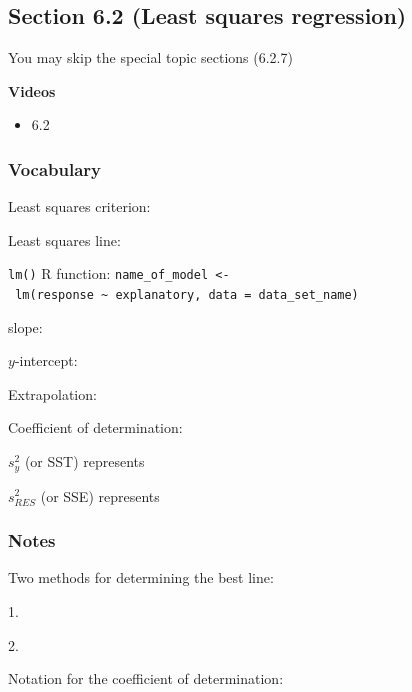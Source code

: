 \documentclass[
]{report}
\providecommand{\tightlist}{%
  \setlength{\itemsep}{0pt}\setlength{\parskip}{0pt}}
\newcommand{\rgs}{\vspace{12pt}} %
\newcommand{\rgi}{\hspace{24pt}}  %
\begin{document}
\hypertarget{section-6.2-least-squares-regression}{%
\subsection*{Section 6.2 (Least squares regression)}\label{section-6.2-least-squares-regression}}


You may skip the special topic sections (6.2.7)

\textbf{Videos}

\begin{itemize}
\tightlist
\item
  6.2
\end{itemize}


\hypertarget{vocabulary-6}{%
\subsubsection*{Vocabulary}\label{vocabulary-6}}

Least squares criterion:
\rgs

Least squares line:
\rgs

\texttt{lm()} R function:
\rgi \texttt{name\_of\_model\ \textless{}-\ lm(response\ \textasciitilde{}\ explanatory,\ data\ =\ data\_set\_name)}

\rgs

slope:
\rgs

\(y\)-intercept:\\
\rgs

Extrapolation:
\rgs 

Coefficient of determination:

\rgi \(s_y^2\) (or SST) represents
\rgs

\rgi \(s_{RES}^2\) (or SSE) represents
\rgs

\hypertarget{notes-8}{%
\subsubsection*{Notes}\label{notes-8}}

Two methods for determining the best line:

\rgi 1.
\rgs

\rgi 2.
\rgs

Notation for the coefficient of determination:
\rgs
\end{document}
